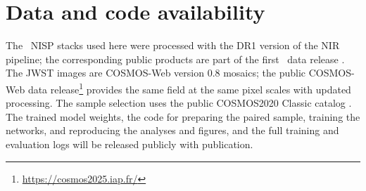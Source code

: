 \documentclass[longauth]{aa}
\begin{document}
\section*{Data and code availability}

The \Euclid\ NISP stacks used here were processed with the DR1 version of the NIR pipeline; the corresponding public products are part of the first \Euclid\ data release \citep{DR1-TP001, DR1cite}.
The JWST images are COSMOS-Web version 0.8 mosaics; the public COSMOS-Web data release\footnote{\url{https://cosmos2025.iap.fr/}} \citep{Franco2025} provides the same field at the same pixel scales with updated processing.
The sample selection uses the public COSMOS2020 Classic catalog \citep{cosmos2020_classic}.
The trained model weights, the code for preparing the paired sample, training the networks, and reproducing the analyses and figures, and the full training and evaluation logs will be released publicly with publication.

\begin{acknowledgements}
\AckDRone
\AckEC
\end{acknowledgements}



\label{LastPage}
\end{document}
